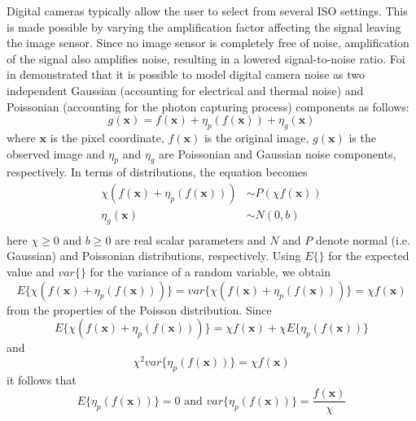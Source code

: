 \documentclass[12pt,notitlepage]{report}
\begin{document}
Digital cameras typically allow the user to select from several ISO settings. This is made possible by varying the amplification factor affecting the signal leaving the image sensor.  Since no image sensor is completely free of noise, amplification of the signal also amplifies noise, resulting in a lowered signal-to-noise ratio. Foi in \cite{foi07} demonstrated that it is possible to model digital camera noise as two independent Gaussian (accounting for electrical and thermal noise) and Poissonian (accounting for the photon capturing process) components as follows: 
\begin{equation}
\label{eq:noise_model}
	g(\mathbf{x}) = f(\mathbf{x}) + \eta_p(f(\mathbf{x})) +  \eta_g(\mathbf{x})
\end{equation}
where $\mathbf{x}$ is the pixel coordinate, $f(\mathbf{x})$ is the original image, $g(\mathbf{x})$ is the observed image and  $\eta_p$ and $\eta_g$ are Poissonian and Gaussian noise components, respectively. In terms of distributions, the equation becomes
\begin{equation}
\label{eq:noise_model_2}
	\begin{split}
		\chi(f(\mathbf{x}) + \eta_p(f(\mathbf{x}))) &\sim P(\chi f(\mathbf{x}))\\
		\eta_g(\mathbf{x}) &\sim N(0,b)\\
	\end{split}
\end{equation}
here $\chi \ge 0$ and $b \geq 0$ are real scalar parameters and $N$ and $P$ denote normal (i.e. Gaussian) and Poissonian distributions, respectively. Using $E\lbrace\rbrace$ for the expected value and $var\lbrace\rbrace$ for the variance of a random variable, we obtain
\begin{equation}
\label{eq:noise_model_3}
	E\lbrace\chi(f(\mathbf{x}) + \eta_p(f(\mathbf{x})))\rbrace = var\lbrace\chi(f(\mathbf{x}) + \eta_p(f(\mathbf{x})))\rbrace = \chi f(\mathbf{x})
\end{equation}
from the properties of the Poisson distribution. Since
\begin{equation}
\label{eq:noise_model_4}
	E\lbrace\chi(f(\mathbf{x}) + \eta_p(f(\mathbf{x})))\rbrace = \chi f(\mathbf{x}) + \chi E \lbrace \eta_p(f(\mathbf{x})) \rbrace
\end{equation}
and 
\begin{equation}
\label{eq:noise_model_5}
	\chi^{2} var \lbrace \eta_p(f(\mathbf{x}))\rbrace = \chi f(\mathbf{x})
\end{equation}
it follows that 
\begin{equation}
\label{eq:noise_model_6}
	E \lbrace \eta_p(f(\mathbf{x}))\rbrace = 0 \text{ and } var \lbrace \eta_p(f(\mathbf{x}))\rbrace = \frac{f(\mathbf{x})}{\chi}
\end{equation}
\end{document}
